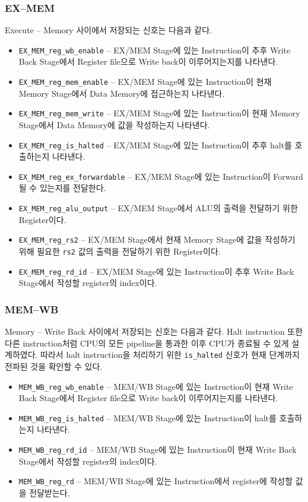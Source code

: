 \documentclass{scrartcl}
\begin{document}
\subsubsection{EX--MEM}
Execute -- Memory 사이에서 저장되는 신호는 다음과 같다.
\begin{itemize}
  \item \texttt{EX\_MEM\_reg\_wb\_enable} -- EX/MEM Stage에 있는 Instruction이 추후 Write Back Stage에서 Register file으로 Write back이 이루어지는지를 나타낸다.
  \item \texttt{EX\_MEM\_reg\_mem\_enable} -- EX/MEM Stage에 있는 Instruction이 현재 Memory Stage에서 Data Memory에 접근하는지 나타낸다.
  \item \texttt{EX\_MEM\_reg\_mem\_write} -- EX/MEM Stage에 있는 Instruction이 현재 Memory Stage에서 Data Memory에 값을 작성하는지 나타낸다.
  \item \texttt{EX\_MEM\_reg\_is\_halted} -- EX/MEM Stage에 있는 Instruction이 추후 halt를 호출하는지 나타낸다.
  \item \texttt{EX\_MEM\_reg\_ex\_forwardable} -- EX/MEM Stage에 있는 Instruction이 Forward될 수 있는지를 전달한다.
  \item \texttt{EX\_MEM\_reg\_alu\_output} -- EX/MEM Stage에서 ALU의 출력을 전달하기 위한 Register이다.
  \item \texttt{EX\_MEM\_reg\_rs2} -- EX/MEM Stage에서 현재 Memory Stage에 값을 작성하기 위해 필요한 \texttt{rs2} 값의 출력을 전달하기 위한 Register이다.
  \item \texttt{EX\_MEM\_reg\_rd\_id} -- EX/MEM Stage에 있는 Instruction이 추후 Write Back Stage에서 작성할 register의 index이다.
\end{itemize}

\subsubsection{MEM--WB}
Memory -- Write Back 사이에서 저장되는 신호는 다음과 같다.
Halt instruction 또한 다른 instruction처럼 CPU의 모든 pipeline을 통과한 이후 CPU가 종료될 수 있게 설계하였다. 따라서 halt instruction을 처리하기 위한
\texttt{is\_halted} 신호가 현재 단계까지 전파된 것을 확인할 수 있다.
\begin{itemize}
  \item \texttt{MEM\_WB\_reg\_wb\_enable} -- MEM/WB Stage에 있는 Instruction이 현재 Write Back Stage에서 Register file으로 Write back이 이루어지는지를 나타낸다.
  \item \texttt{MEM\_WB\_reg\_is\_halted} -- MEM/WB Stage에 있는 Instruction이 halt를 호출하는지 나타낸다.
  \item \texttt{MEM\_WB\_reg\_rd\_id} -- MEM/WB Stage에 있는 Instruction이 현재 Write Back Stage에서 작성할 register의 index이다.
  \item \texttt{MEM\_WB\_reg\_rd} -- MEM/WB Stage에 있는 Instruction에서 register에 작성할 값을 전달받는다.
\end{itemize}
\end{document}
